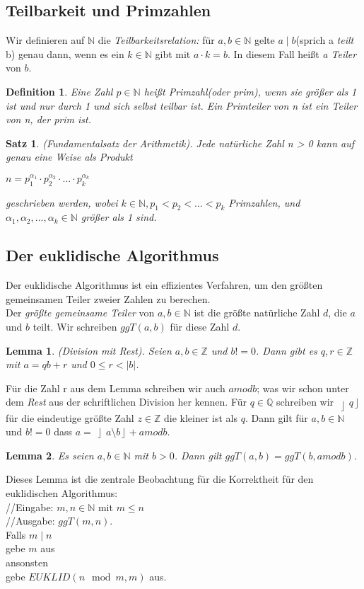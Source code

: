 \documentclass{scrartcl}
\newtheorem{defi}{Definition}
\newtheorem{satz}{Satz}
\newtheorem{lem}{Lemma}
\begin{document}
\subsection{Teilbarkeit und Primzahlen}
Wir definieren auf $\mathbb{N}$ die \emph{Teilbarkeitsrelation:} für $a,b \in \mathbb{N}$ gelte $a\mid b$(sprich a \emph{teilt} b) genau dann, wenn es ein $k \in \mathbb{N}$ gibt mit $a \cdot k = b$. In diesem Fall heißt \emph{a Teiler} von $b$. 
\begin{defi}Eine Zahl $p\in \mathbb{N}$ heißt Primzahl(oder prim), wenn sie größer als 1 ist und nur durch 1 und sich selbst teilbar ist. Ein Primteiler von n ist ein Teiler von n, der prim ist. 
\end{defi}
\begin{satz}(Fundamentalsatz der Arithmetik). Jede natürliche Zahl n > 0 kann auf genau eine Weise als Produkt 
\begin{center}$n=p_{1}^{\alpha_{1}} \cdot p_{2}^{\alpha_{2}} \cdot ... \cdot p_{k}^{\alpha_{k}}$\end{center}
geschrieben werden, wobei $k \in \mathbb{N}, p_1 < p_2 < ... < p_k$ Primzahlen, und 
$\alpha_1, \alpha_2, ..., \alpha_k \in \mathbb{N}$ größer als 1 sind. 
\end{satz}
\subsection{Der euklidische Algorithmus}
Der euklidische Algorithmus ist ein effizientes Verfahren, um den größten gemeinsamen Teiler zweier Zahlen zu berechen. \\
Der \emph{größte gemeinsame Teiler} von $a,b \in \mathbb{N}$ ist die größte natürliche Zahl $d$, die $a$ und $b$ teilt. Wir schreiben $ggT(a,b)$ für diese Zahl $d$. 
\begin{lem}(Division mit Rest). Seien $a,b \in \mathbb{Z}$ und $b!=0$. Dann gibt es $q,r \in \mathbb{Z}$ mit $a=qb+r$ und $0\leq r < |b|$.
\end{lem}
Für die Zahl r aus dem Lemma schreiben wir auch $a mod b$; was wir schon unter dem \emph{Rest} aus der schriftlichen Division her kennen. Für $q \in \mathbb{Q}$ schreiben wir $\left\rfloor{q}\right\rfloor$ für die eindeutige größte Zahl $z \in \mathbb{Z}$ die kleiner ist als $q$. Dann gilt für $a,b \in \mathbb{N}$ und $b!=0$ dass $a=\left\rfloor{a\setminus b}\right\rfloor + a mod b.$

\begin{lem}
Es seien $a,b \in \mathbb{N}$ mit $b > 0$. Dann gilt $ggT(a,b)=ggT(b, a mod b)$.
\end{lem}
Dieses Lemma ist die zentrale Beobachtung für die Korrektheit für den euklidischen Algorithmus:
\\
//Eingabe: $m,n \in \mathbb{N}$ mit $m\leq n$\\
//Ausgabe: $ggT(m,n)$. \\
Falls $m\mid n$\\
\hspace{4pt}gebe $m$ aus\\
ansonsten\\
\hspace{4pt}gebe $EUKLID(n\mod{m},m)$ aus.
\end{document}
